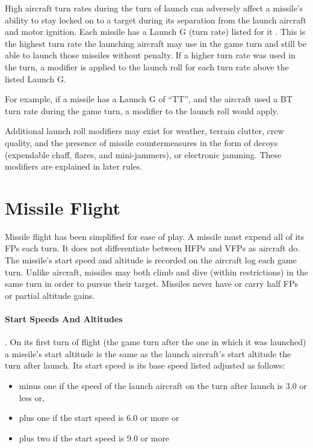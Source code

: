 High aircraft turn rates during the turn of launch can adversely affect a missile's ability to stay locked on to a target during its separation from the launch aircraft and motor ignition. Each missile has a Launch G (turn rate) listed for it . This is the highest turn rate the launching aircraft may use in the game turn and still be able to launch those missiles without penalty. If a higher turn rate was used in the turn, a  modifier is applied to the launch roll for each turn rate above the listed Launch G.

For example, if a missile has a Launch G of “TT”, and the aircraft used a BT turn rate during the game turn, a  modifier to the launch roll would apply.

Additional launch roll modifiers may exist for weather, terrain clutter, crew quality, and the presence of missile countermeasures in the form of decoys (expendable chaff, flares, and mini-jammers), or electronic jamming. These modifiers are explained in later rules.

\section{Missile Flight}
\label{rule:missile-flight}

Missile flight has been simplified for ease of play. A missile must expend all of its FPs each turn. It does not differentiate between HFPs and VFPs as aircraft do. The missile's start speed and altitude is recorded on the aircraft log each game turn. Unlike aircraft, missiles may both climb and dive (within restrictions) in the same turn in order to pursue their target. Missiles never have or carry half FPs or partial altitude gains.

\paragraph{Start Speeds And Altitudes}. On its first turn of flight (the game turn after the one in which it was launched) a missile's start altitude is the same as the launch aircraft's start altitude the turn after launch. Its start speed is its base speed listed  adjusted as follows:

\begin{itemize}

    \item minus one if the speed of the launch aircraft on the turn after launch is 3.0 or less or,

    \item plus one if the start speed is 6.0 or more or

    \item plus two if the start speed is 9.0 or more
\end{itemize}

